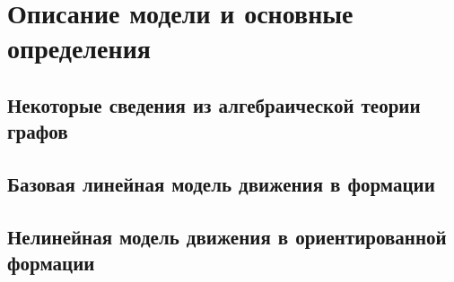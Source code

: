\chapter{Описание модели и основные определения} \label{definitions}

\section{Некоторые сведения из алгебраической теории графов}
\section{Базовая линейная модель движения в формации}
\section{Нелинейная модель движения в ориентированной формации}

\clearpage
